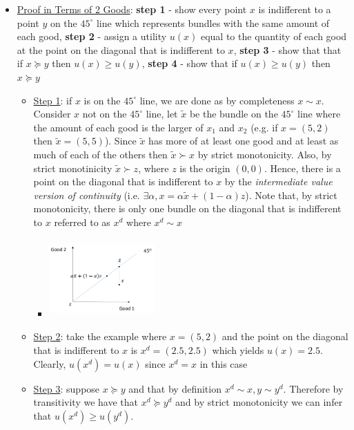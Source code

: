 \documentclass{article}
\begin{document}
  \begin{itemize}
    \item  \underline{Proof in Terms of 2 Goods}: \textbf{step 1} - show every point $x$ is indifferent to a point $y$ on the $45^{\circ}$ line which represents bundles with the same amount of each good, \textbf{step 2} - assign a utility $u(x)$ equal to the quantity of each good at the point on the diagonal that is indifferent to $x$, \textbf{step 3} - show that that if $x \succeq y$ then $u(x) \geq u(y)$, \textbf{step 4} - show that if $u(x) \geq u(y)$ then $x \succeq y$
    \begin{itemize}
      \item  \underline{Step 1}: if $x$ is on the $45^{\circ}$ line, we are done as by completeness $x \sim x$. Consider $x$ not on the $45^{\circ}$ line, let $\widetilde{x}$ be the bundle on the $45^{\circ}$ line where the amount of each good is the larger of $x_{1}$ and $x_{2}$ (e.g. if $x = (5,2)$ then $\widetilde{x} = (5,5)$). Since $\widetilde{x}$ has more of at least one good and at least as much of each of the others then $\widetilde{x} \succ x$ by strict monotonicity. Also, by strict monotinicity $\widetilde{x} \succ z$, where $z$ is the origin $(0,0)$. Hence, there is a point on the diagonal that is indifferent to $x$ by the \textit{intermediate value version of continuity} (i.e. $\exists \alpha, x = \alpha \widetilde{x} + (1-\alpha)z$). Note that, by strict monotonicity, there is only one bundle on the diagonal that is indifferent to $x$ referred to as $x^{d}$ where $x^{d} \sim x$
      \begin{itemize}
        \item  \includegraphics[width=4cm, height=3cm]{pic10}
      \end{itemize}
      \item  \underline{Step 2}: take the example where $x = (5,2)$ and the point on the diagonal that is indifferent to $x$ is $x^{d} = (2.5, 2.5)$ which yields $u(x) = 2.5$. Clearly, $u(x^{d}) = u(x)$ since $x^{d} = x$ in this case
      \item  \underline{Step 3}: suppose $x \succeq y$ and that by definition $x^{d} \sim x, y \sim y^{d}$. Therefore by transitivity we have that $x^{d} \succeq y^{d}$ and by strict monotonicity we can infer that $u(x^{d}) \geq u(y^{d})$.

\end{itemize}
\end{itemize}
\end{document}
